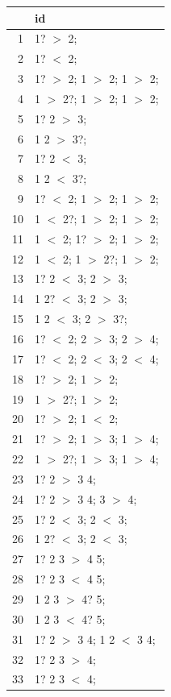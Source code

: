 \documentclass[11pt]{article}
\begin{document}
\begin{table}[t]
\centering
\begin{tabular}{rl}
  \hline
 & id \\ 
  \hline
1 & 1? $>$ 2;  \\ 
  2 & 1? $<$ 2;  \\ 
  3 & 1? $>$ 2; 1 $>$ 2; 1 $>$ 2;  \\ 
  4 & 1 $>$ 2?; 1 $>$ 2; 1 $>$ 2;  \\ 
  5 & 1? 2 $>$ 3;  \\ 
  6 & 1 2 $>$ 3?;  \\ 
  7 & 1? 2 $<$ 3;  \\ 
  8 & 1 2 $<$ 3?;  \\ 
  9 & 1? $<$ 2; 1 $>$ 2; 1 $>$ 2;  \\ 
  10 & 1 $<$ 2?; 1 $>$ 2; 1 $>$ 2;  \\ 
  11 & 1 $<$ 2; 1? $>$ 2; 1 $>$ 2;  \\ 
  12 & 1 $<$ 2; 1 $>$ 2?; 1 $>$ 2;  \\ 
  13 & 1? 2 $<$ 3; 2 $>$ 3;  \\ 
  14 & 1 2? $<$ 3; 2 $>$ 3;  \\ 
  15 & 1 2 $<$ 3; 2 $>$ 3?;  \\ 
  16 & 1? $<$ 2; 2 $>$ 3; 2 $>$ 4;  \\ 
  17 & 1? $<$ 2; 2 $<$ 3; 2 $<$ 4;  \\ 
  18 & 1? $>$ 2; 1 $>$ 2;  \\ 
  19 & 1 $>$ 2?; 1 $>$ 2;  \\ 
  20 & 1? $>$ 2; 1 $<$ 2;  \\ 
  21 & 1? $>$ 2; 1 $>$ 3; 1 $>$ 4;  \\ 
  22 & 1 $>$ 2?; 1 $>$ 3; 1 $>$ 4;  \\ 
  23 & 1? 2 $>$ 3 4;  \\ 
  24 & 1? 2 $>$ 3 4; 3 $>$ 4;  \\ 
  25 & 1? 2 $<$ 3; 2 $<$ 3;  \\ 
  26 & 1 2? $<$ 3; 2 $<$ 3;  \\ 
  27 & 1? 2 3 $>$ 4 5;  \\ 
  28 & 1? 2 3 $<$ 4 5;  \\ 
  29 & 1 2 3 $>$ 4? 5;  \\ 
  30 & 1 2 3 $<$ 4? 5;  \\ 
  31 & 1? 2 $>$ 3 4; 1 2 $<$ 3 4;  \\ 
  32 & 1? 2 3 $>$ 4;  \\ 
  33 & 1? 2 3 $<$ 4;  \\ 
   \hline
\end{tabular}
\end{table}
\end{document}
